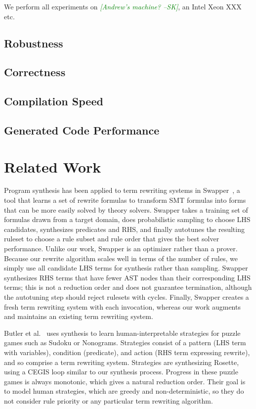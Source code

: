 \documentclass[sigplan,review,anonymous]{acmart}\settopmatter{printfolios=true,printccs=false,printacmref=false}
\newcommand{\sak}[1]{\textcolor{green}{\textit{[{#1} --SK]}}}
\begin{document}
We perform all experiments on \sak{Andrew's machine?}, an Intel Xeon XXX etc.

\subsection{Robustness}

\subsection{Correctness}

\subsection{Compilation Speed}

\subsection{Generated Code Performance}


\section{Related Work}

Program synthesis has been applied to term rewriting systems in Swapper~\cite{singh2016swapper}, a tool that learns a set of rewrite formulas to transform SMT formulas into forms that can be more easily solved by theory solvers. Swapper takes a training set of formulas drawn from a target domain, does probabilistic sampling to choose LHS candidates, synthesizes predicates and RHS, and finally autotunes the resulting ruleset to choose a rule subset and rule order that gives the best solver performance. Unlike our work, Swapper is an optimizer rather than a prover. Because our rewrite algorithm scales well in terms of the number of rules, we simply use all candidate LHS terms for synthesis rather than sampling. Swapper synthesizes RHS terms that have fewer AST nodes than their corresponding LHS terms; this is not a reduction order and does not guarantee termination, although the autotuning step should reject rulesets with cycles. Finally, Swapper creates a fresh term rewriting system with each invocation, whereas our work augments and maintains an existing term rewriting system.

Butler et al.~\cite{butler2017synthesizing} uses synthesis to learn human-interpretable strategies for puzzle games such as Sudoku or Nonograms. Strategies consist of a pattern (LHS term with variables), condition (predicate), and action (RHS term expressing rewrite), and so comprise a term rewriting system. Strategies are synthesizing Rosette, using a CEGIS loop similar to our synthesis process. Progress in these puzzle games is always monotonic, which gives a natural reduction order. Their goal is to model human strategies, which are greedy and non-deterministic, so they do not consider rule priority or any particular term rewriting algorithm. 
\end{document}
